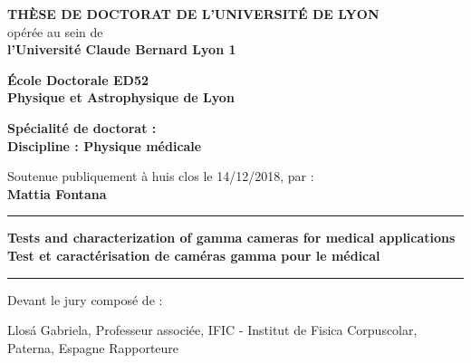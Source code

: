 \begin{center}
\fontsize{14pt}{16pt}\selectfont
\textbf{\uppercase{Th\`{e}se de doctorat de l'universit\'{e} de Lyon}}\\
\fontsize{12pt}{14pt}\selectfont
op\'{e}r\'{e}e au sein de\\
\textbf{l'Universit\'{e} Claude Bernard Lyon 1}

\vspace{0.5cm}

\textbf{\'{E}cole Doctorale ED52\\%
Physique et Astrophysique de Lyon}%

\vspace{0.5cm}

\textbf{Sp\'{e}cialit\'{e} de doctorat :\\
Discipline : Physique m\'{e}dicale} %


\vspace{1.5cm}

Soutenue publiquement \`{a} huis clos le 14/12/2018, par :\\
\fontsize{14pt}{16pt}\selectfont
\textbf{Mattia Fontana}

\vspace{1.5cm} %

\rule[20pt]{\textwidth}{0.5pt}

\fontsize{25pt}{28pt}\selectfont
\textbf{Tests and characterization of gamma cameras for medical applications}\\
\vspace{0.5cm}
\fontsize{20pt}{23pt}\selectfont
\textbf{Test et caract\'{e}risation de cam\'{e}ras gamma pour le m\'{e}dical}

\rule{\textwidth}{0.5pt}

\vspace{2cm} %
\end{center}

\fontsize{12pt}{14pt}\selectfont
Devant le jury compos\'{e} de :
\bigskip

\fontsize{11pt}{13pt}\selectfont


\bigskip

Llos\'{a} Gabriela, Professeur associ\'{e}e, IFIC - Institut de Fisica Corpuscolar, Paterna, Espagne \newline \hfill Rapporteure

